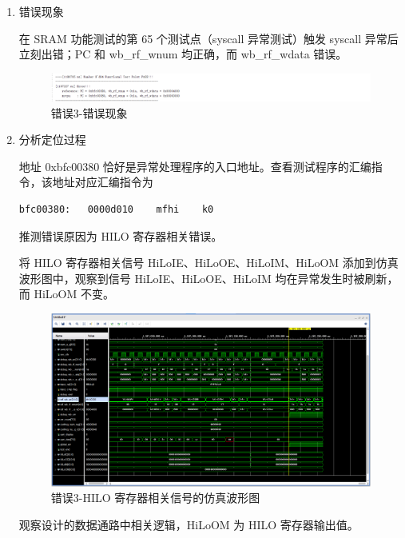 \begin{enumerate}[(1)]
    \item 错误现象

在 SRAM 功能测试的第 65 个测试点（syscall 异常测试）触发 syscall 异常后立刻出错；PC 和 wb\_rf\_wnum 均正确，而 wb\_rf\_wdata 错误。

\begin{figure}[H]
    \centering
    \includegraphics[width=\textwidth]{image/错误3-错误现象1.png}
    \caption{错误3-错误现象}
    \label{fig:错误3-错误现象1}
\end{figure}

    \item 分析定位过程

地址 0xbfc00380 恰好是异常处理程序的入口地址。查看测试程序的汇编指令，该地址对应汇编指令为

\begin{lstlisting}
bfc00380:	0000d010 	mfhi	k0
\end{lstlisting}

推测错误原因为 HILO 寄存器相关错误。

将 HILO 寄存器相关信号 HiLoIE、HiLoOE、HiLoIM、HiLoOM 添加到仿真波形图中，观察到信号 HiLoIE、HiLoOE、HiLoIM 均在异常发生时被刷新，而 HiLoOM 不变。

\begin{figure}[H]
    \centering
    \includegraphics[width=\textwidth]{image/错误3-分析定位过程1.png}
    \caption{错误3-HILO 寄存器相关信号的仿真波形图}
    \label{fig:错误3-分析定位过程1}
\end{figure}

观察设计的数据通路中相关逻辑，HiLoOM 为 HILO 寄存器输出值。


\end{enumerate}
